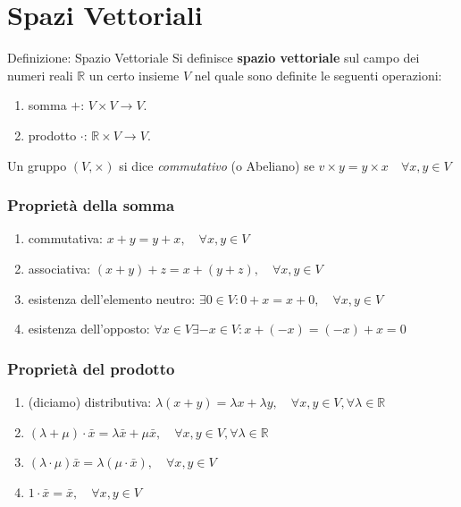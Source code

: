 \documentclass[x11names]{article}
\begin{document}
\newpage
\section{Spazi Vettoriali}
\begin{center}
\colorbox{myblue}{\begin{minipage}{5.75in}
\begin{blues}{Definizione: Spazio Vettoriale}
    Si definisce \textbf{spazio vettoriale} sul campo dei numeri reali $\mathbb{R}$ un certo insieme $V$ nel quale sono definite le seguenti operazioni:
    \begin{enumerate}
        \item somma $+$: $V \times V \longrightarrow V$.
        \item prodotto $\cdot$: $\mathbb{R} \times V \longrightarrow V$.
        \end{enumerate}
	Un gruppo $\left(V,\times \right)$ si dice \textit{commutativo} (o Abeliano) se $v \times y = y \times x \quad \forall x,y \in V$
\end{blues}
\end{minipage}}        
\end{center}


\subsubsection{Proprietà della somma}
\begin{enumerate}
    \item commutativa: $x + y = y + x, \quad \forall x,y \in V$
    \item associativa: $(x+y)+z = x + (y+z),\quad \forall x,y \in V$
    \item esistenza dell'elemento neutro: $\exists 0 \in V : 0 + x = x +0, \quad \forall x,y \in V$
    \item esistenza dell'opposto: $\forall x \in V \exists -x \in V : x + (-x) = (-x) +x = 0$
\end{enumerate}
\subsubsection{Proprietà del prodotto}
\begin{enumerate}
    \item (diciamo) distributiva: $\lambda(x+y) = \lambda x + \lambda y,\quad \forall x,y \in V, \forall \lambda \in \mathbb{R}$
    \item $(\lambda + \mu)\cdot \bar{x} = \lambda \bar{x} + \mu \bar{x}, \quad \forall x,y \in V, \forall \lambda \in \mathbb{R}$
    \item $(\lambda \cdot \mu)\bar{x} = \lambda(\mu \cdot \bar{x}),\quad \forall x,y \in V$
    \item $1 \cdot \bar{x} = \bar{x}, \quad \forall x,y \in V$
\end{enumerate}
\end{document}
